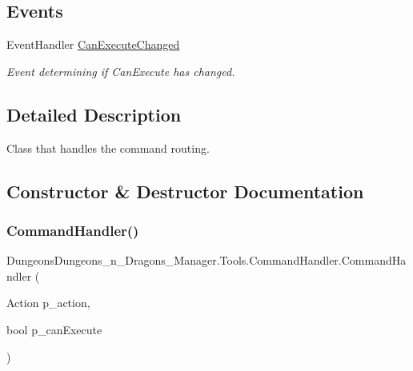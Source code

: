 \subsection*{Events}
\begin{DoxyCompactItemize}
\item 
Event\+Handler \mbox{\hyperlink{class_dungeons_dungeons__n___dragons___manager_1_1_tools_1_1_command_handler_a8f528cca4266f4619a35c38fc7524eef}{Can\+Execute\+Changed}}
\begin{DoxyCompactList}\small\item\em Event determining if Can\+Execute has changed. \end{DoxyCompactList}\end{DoxyCompactItemize}


\subsection{Detailed Description}
Class that handles the command routing. 



\subsection{Constructor \& Destructor Documentation}
\mbox{\label{class_dungeons_dungeons__n___dragons___manager_1_1_tools_1_1_command_handler_a2b2ec0ea1f5502d143bd542abf6814f1}} 
\subsubsection{\texorpdfstring{Command\+Handler()}{CommandHandler()}}
{\footnotesize\ttfamily Dungeons\+Dungeons\+\_\+n\+\_\+\+Dragons\+\_\+\+Manager.\+Tools.\+Command\+Handler.\+Command\+Handler (\begin{DoxyParamCaption}\item[{Action}]{p\+\_\+action,  }\item[{bool}]{p\+\_\+can\+Execute }\end{DoxyParamCaption})\hspace{0.3cm}{\ttfamily [inline]}}



